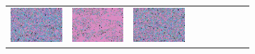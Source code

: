 \documentclass{ipol}
\begin{document}
\begin{figure}[ht]
\begin{subfigure}[t]{\linewidth}
\begin{tabular}{ccccccccc}
                \includegraphics[width=\s]{images/tower/DHT/iso_n10_64_grids.png}&
                \includegraphics[width=\s]{images/tower/LINEAR/iso_n10_64_grids.png}&
                \includegraphics[width=\s]{images/tower/PPG/iso_n10_64_grids.png}&

\end{tabular}
\end{subfigure}
\end{figure}
\end{document}
